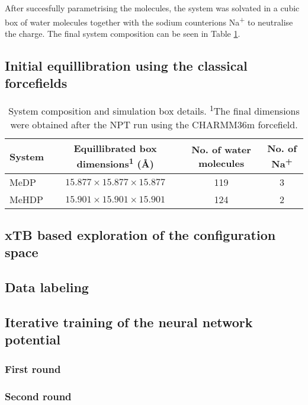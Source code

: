 After succesfully parametrising the molecules, the system was solvated in a cubic box of water molecules together with the sodium counterions Na\textsuperscript{+} to neutralise the charge. The final system composition can be seen in Table \ref{tab:system-before-equillibration}.

\subsection{Initial equillibration using the classical forcefields}

\begin{table}[htbp]
    \centering
    \caption{System composition and simulation box details. \textsuperscript{1}The final dimensions were obtained after the NPT run using the CHARMM36m forcefield.}
    \label{tab:system-before-equillibration}
    \begin{tabular}{@{}lccc@{}}
    \toprule
    System & Equillibrated box dimensions\textsuperscript{1} (\AA) & No. of water molecules & No. of Na\textsuperscript{+} \\
    \midrule
    MeDP  & $15.877 \times 15.877 \times 15.877$ & 119 & 3 \\
    MeHDP & $15.901 \times 15.901 \times 15.901$ & 124 & 2 \\
    \bottomrule
    \end{tabular}
\end{table}
\subsection{xTB based exploration of the configuration space}

\subsection{Data labeling}

\subsection{Iterative training of the neural network potential}

\subsubsection{First round}

\subsubsection{Second round}

